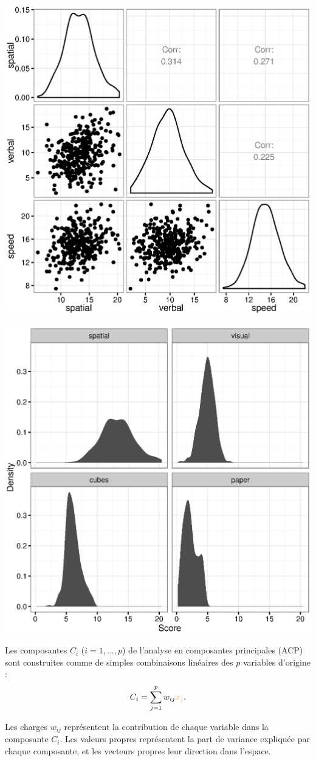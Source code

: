 \foilhead{}


{\centering \includegraphics[width=.55\textwidth]{figs/fig-HS-ggpairs.eps}\par}

\foilhead{}


{\centering \includegraphics[width=.55\textwidth]{figs/fig-HS-hist.eps}\par}


Les composantes $C_i$ ($i=1,\dots,p$) de l'analyse en composantes principales
(ACP) sont construites comme de simples combinaisons linéaires des $p$ variables
d'origine :
\[
C_i=\sum_{j=1}^pw_{ij}\textcolor{Apricot}{x_j}.
\]

Les charges $w_{ij}$ représentent la contribution de chaque variable dans la
composante $C_i$. Les valeurs propres représentent la part de variance expliquée
par chaque composante, et les vecteurs propres leur direction dans l'espace.

